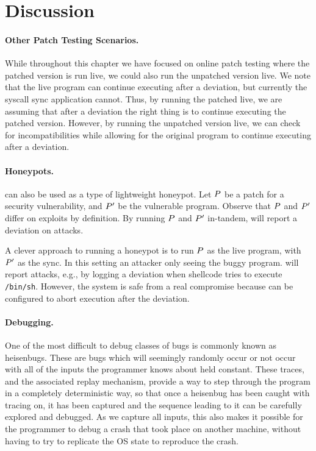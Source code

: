 \section{Discussion}
\label{tach:sec:discussion}

\paragraph{Other Patch Testing Scenarios.} While throughout this chapter we have focused on online patch testing
where the patched version is run live, we could also run the unpatched
version live.  We note that the live program can continue executing
after a deviation, but currently the syscall sync application cannot.
Thus, by running the patched live, we are assuming that after a
deviation the right thing is to continue executing the patched
version.  However, by running the  unpatched version live, we can
check for incompatibilities while allowing for the original program to
continue executing after a deviation.

\paragraph{Honeypots.} \tachyon can also be used as a type of
lightweight honeypot. Let $P$ be a patch for a security
vulnerability, and $P'$ be the vulnerable program. Observe
that $P$ and $P'$ differ on exploits by definition.  By
running $P$ and $P'$ in-tandem, \tachyon will report a
deviation on attacks.

A clever approach to running a honeypot is to run $P$ as the live
program, with $P'$ as the sync. In this setting an attacker
only seeing the buggy program. \tachyon will report attacks, e.g., by
logging a deviation when shellcode tries to execute \texttt{/bin/sh}.
However, the system is safe from a real compromise because \tachyon
can be configured to abort execution after the deviation.



\paragraph{Debugging.} One of the most difficult to debug classes of
bugs is commonly known as heisenbugs. These are bugs which will
seemingly randomly occur or not occur with all of the inputs the
programmer knows about held constant. These traces, and the
associated replay mechanism, provide a way to step through the program
in a completely deterministic way, so that once a heisenbug has been
caught with tracing on, it has been captured and the sequence leading
to it can be carefully explored and debugged. As we capture all
inputs, this also makes it possible for the programmer to debug a
crash that took place on another machine, without having to try to
replicate the OS state to reproduce the crash.

